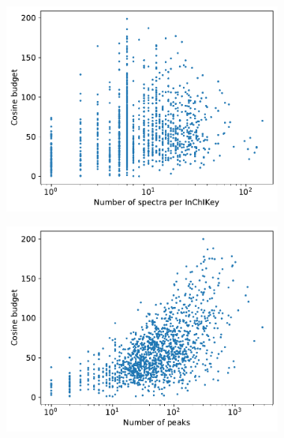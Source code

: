 \begin{figure}[htbp]
    \centering
    \begin{subfigure}[b]{0.49\textwidth}
        \centering
        \includegraphics[width=\textwidth]{include/img/results/sum_cosine_vs_spectra.pdf}
        \caption{}
        \label{fig:sum_cosine_vs_spectra}
        \vspace{0.1cm}
        \begin{minipage}[t]{\textwidth}
        \end{minipage}
    \end{subfigure}
    \hfill
    \begin{subfigure}[b]{0.49\textwidth}
        \centering
        \includegraphics[width=\textwidth]{include/img/results/sum_cosine.pdf}
        \caption{}
        \label{fig:sum_cosine_vs_matched_peaks}
        \vspace{0.1cm}
        \begin{minipage}[t]{\textwidth}
        \end{minipage}
    \end{subfigure}


\end{figure}
